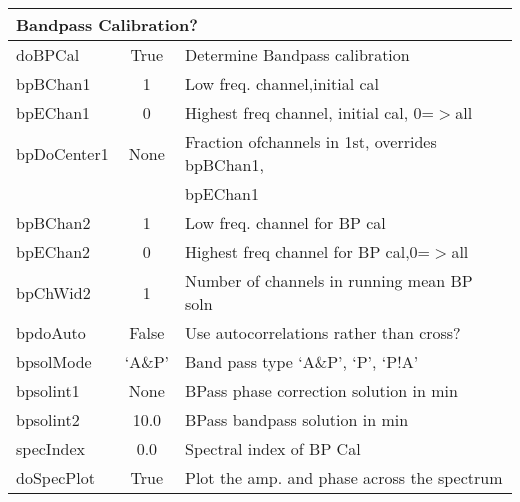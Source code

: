 \documentclass[11pt]{article}
\begin{document}
\begin{center}
\begin{tabular}{|l|c|l|}
\hline
\multicolumn{3}{|l|}{Bandpass Calibration?} \\
\hline
doBPCal & True & Determine Bandpass calibration \\
bpBChan1 & 1 & Low freq. channel,initial cal \\
bpEChan1 & 0 & Highest freq channel, initial cal, 0=$>$all \\
bpDoCenter1 & None & Fraction ofchannels in 1st, overrides bpBChan1, \\
 & & bpEChan1 \\
bpBChan2 & 1 & Low freq. channel for BP cal \\
bpEChan2 & 0 & Highest freq channel for BP cal,0=$>$all  \\
bpChWid2 & 1 & Number of channels in running mean BP soln \\
bpdoAuto & False & Use autocorrelations rather than cross? \\
bpsolMode & `A\&P' & Band pass type `A\&P', `P', `P!A' \\
bpsolint1 & None & BPass phase correction solution in min \\
bpsolint2 & 10.0 & BPass bandpass solution in min \\
specIndex & 0.0 & Spectral index of BP Cal \\
doSpecPlot & True & Plot the amp. and phase across the spectrum \\

\hline
\end{tabular}
\end{center}
\clearpage
\end{document}
